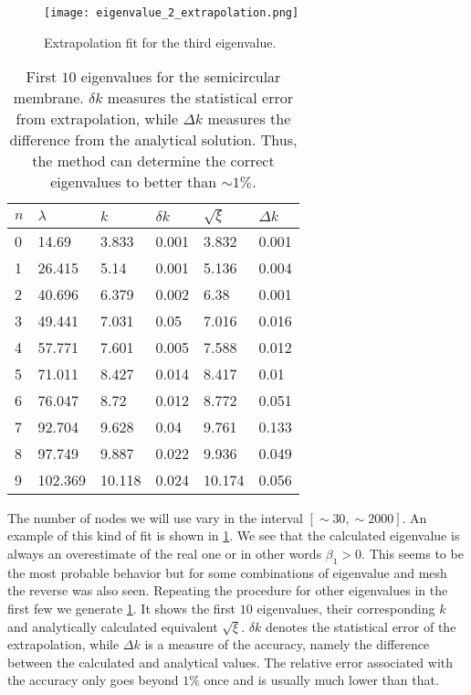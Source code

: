 \documentclass[10pt,a4paper,twocolumn]{article}
\begin{document}
\begin{figure}[!t]
    \centering
    \texttt{[image: eigenvalue\_2\_extrapolation.png]}
    \caption{Extrapolation fit for the third eigenvalue.}
    \label{fig:lmd3_fit}
\end{figure}

\begin{table}[!b]
    \centering
    \begin{tabular}{|l|l|l|l|l|l|}
    \hline
    $n$ & $\lambda$ & $k$ & $\delta k$ & $\sqrt{\xi}$ & $\Delta k$\\ \hline \hline
    0 & 14.69   & 3.833  & 0.001 & 3.832  & 0.001 \\ \hline
    1 & 26.415  & 5.14   & 0.001 & 5.136  & 0.004 \\ \hline
    2 & 40.696  & 6.379  & 0.002 & 6.38   & 0.001 \\ \hline
    3 & 49.441  & 7.031  & 0.05  & 7.016  & 0.016 \\ \hline
    4 & 57.771  & 7.601  & 0.005 & 7.588  & 0.012 \\ \hline
    5 & 71.011  & 8.427  & 0.014 & 8.417  & 0.01  \\ \hline
    6 & 76.047  & 8.72   & 0.012 & 8.772  & 0.051 \\ \hline
    7 & 92.704  & 9.628  & 0.04  & 9.761  & 0.133 \\ \hline
    8 & 97.749  & 9.887  & 0.022 & 9.936  & 0.049 \\ \hline
    9 & 102.369 & 10.118 & 0.024 & 10.174 & 0.056 \\ \hline
    \end{tabular}
    \caption{First $10$ eigenvalues for the semicircular membrane. $\delta k$ measures the statistical error from extrapolation, while $\Delta k$ measures the difference from the analytical solution. Thus, the method can determine the correct eigenvalues to better than $\sim 1\%$.}
    \label{tab:semi_extrap}
\end{table}

The number of nodes we will use vary in the interval $[\sim\! 30, \sim\! 2000]$. An example of this kind of fit is shown in \cref{fig:lmd3_fit}. We see that the calculated eigenvalue is always an overestimate of the real one or in other words $\beta_1>0$. This seems to be the most probable behavior but for some combinations of eigenvalue and mesh the reverse was also seen. Repeating the procedure for other eigenvalues in the first few we generate \cref{tab:semi_extrap}. It shows the first $10$ eigenvalues, their corresponding $k$ and analytically calculated equivalent $\sqrt{\xi}$. $\delta k$ denotes the statistical error of the extrapolation, while $\Delta k$ is a measure of the accuracy, namely the difference between the calculated and analytical values. The relative error associated with the accuracy only goes beyond $1\%$ once and is usually much lower than that.
\end{document}
